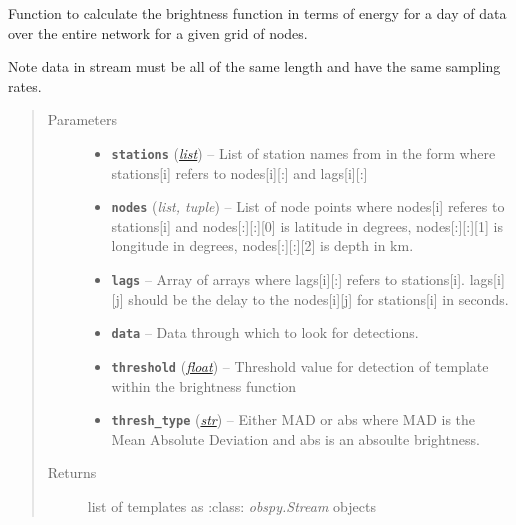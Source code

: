 \documentclass[a4paper,10pt,english]{sphinxmanual}
\begin{document}

\begin{fulllineitems}
\label{modules:bright_lights.brightness}
Function to calculate the brightness function in terms of energy for a day
of data over the entire network for a given grid of nodes.

Note data in stream must be all of the same length and have the same
sampling rates.
\begin{quote}\begin{description}
\item[{Parameters}] \leavevmode\begin{itemize}
\item {} 
\textbf{\texttt{stations}} (\href{https://docs.python.org/library/functions.html\#list}{\emph{list}}) -- List of station names from in the form where stations{[}i{]}    refers to nodes{[}i{]}{[}:{]} and lags{[}i{]}{[}:{]}

\item {} 
\textbf{\texttt{nodes}} (\emph{list, tuple}) -- List of node points where nodes{[}i{]} referes to stations{[}i{]} and    nodes{[}:{]}{[}:{]}{[}0{]} is latitude in degrees, nodes{[}:{]}{[}:{]}{[}1{]} is longitude in    degrees, nodes{[}:{]}{[}:{]}{[}2{]} is depth in km.

\item {} 
\textbf{\texttt{lags}} -- Array of arrays where lags{[}i{]}{[}:{]} refers to stations{[}i{]}.    lags{[}i{]}{[}j{]} should be the delay to the nodes{[}i{]}{[}j{]} for stations{[}i{]} in seconds.

\item {} 
\textbf{\texttt{data}} -- Data through which to look for detections.

\item {} 
\textbf{\texttt{threshold}} (\href{https://docs.python.org/library/functions.html\#float}{\emph{float}}) -- Threshold value for detection of template within the    brightness function

\item {} 
\textbf{\texttt{thresh\_type}} (\href{https://docs.python.org/library/functions.html\#str}{\emph{str}}) -- Either MAD or abs where MAD is the Mean Absolute    Deviation and abs is an absoulte brightness.

\end{itemize}

\item[{Returns}] \leavevmode
list of templates as :class: \emph{obspy.Stream} objects

\end{description}\end{quote}

\end{fulllineitems}
\end{document}
